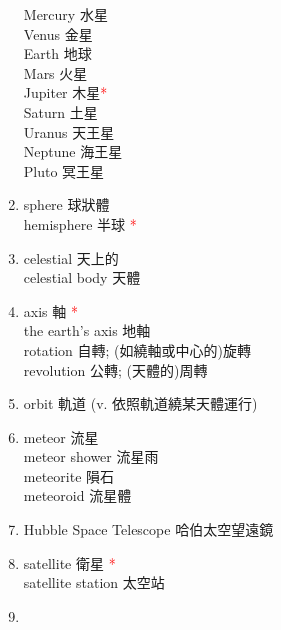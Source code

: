 \documentclass[twoside,b5paper]{book}
\begin{document}
\begin{enumerate}
      Mercury 水星\\
      Venus 金星\\
      Earth 地球\\
      Mars 火星\\
      Jupiter 木星\textcolor{red}{*}\\
      Saturn  土星\\
      Uranus  天王星\\
      Neptune  海王星\\
      Pluto  冥王星
    \item
      sphere  球狀體\\
      hemisphere  半球 \textcolor{red}{*}\\
    \item
      celestial  天上的\\
      celestial body 天體
    \item
      axis  軸 \textcolor{red}{*}\\
      the earth's axis 地軸\\
      rotation 自轉; (如繞軸或中心的)旋轉\\
      revolution 公轉; (天體的)周轉\\
    \item
      orbit  軌道 (v. 依照軌道繞某天體運行)
    \item
      meteor  流星\\
      meteor shower 流星雨\\
      meteorite  隕石\\
      meteoroid  流星體\\
    \item
      Hubble Space Telescope 哈伯太空望遠鏡
    \item
      satellite  衛星 \textcolor{red}{*}\\
      satellite station 太空站
    \item

\end{enumerate}
\end{document}
